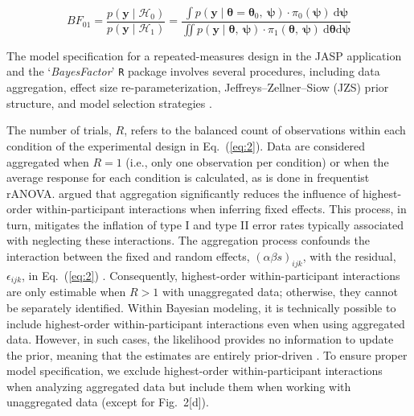\documentclass[preprint,12pt,authoryear]{elsarticle}
\begin{document}
\begin{equation} \label{eq:4}
	\mathit{BF}_{01}=\frac{p(\mathbf{y}\mid\mathcal{H}_0)}{p(\mathbf{y}\mid\mathcal{H}_1)}=\frac{\int p(\mathbf{y}\mid\boldsymbol{\theta}=\boldsymbol{\theta}_0,\ \!\boldsymbol{\psi})\cdot\pi_0(\boldsymbol{\psi})\ \!\mathrm{d}\boldsymbol{\psi}}{\iint p(\mathbf{y}\mid\boldsymbol{\theta},\ \!\boldsymbol{\psi})\cdot\pi_1(\boldsymbol{\theta},\ \!\boldsymbol{\psi})\ \!\mathrm{d}\boldsymbol{\theta}\mathrm{d}\boldsymbol{\psi}}
\end{equation}

The model specification for a repeated-measures design in the JASP application and the `\textit{BayesFactor}' \texttt{R} package involves several procedures, including data aggregation, effect size re-parameterization, Jeffreys–Zellner–Siow (JZS) prior structure, and model selection strategies \citetext{%
	\citealp{van_doorn_bayes_2023,van_doorn_bayes_2023-1,van_doorn_bayes_2023-2}; %
	see also \citealp{heathcote_limits_2023,heck_benefits_2023,jeffreys_invariant_1946,liang_mixtures_2008,linde_bayes_2023,rouder_principles_2023,singmann_statistics_2023,vasishth_sample_2023,verissimo_when_2023,zellner_posterior_1980}}.
	
The number of trials, $R$, refers to the balanced count of observations within each condition of the experimental design in Eq.~(\ref{eq:2}). Data are considered aggregated when $R=1$ (i.e., only one observation per condition) or when the average response for each condition is calculated, as is done in frequentist rANOVA. \citet[p.~4]{van_doorn_bayes_2023} argued that aggregation significantly reduces the influence of highest-order within-participant interactions when inferring fixed effects. This process, in turn, mitigates the inflation of type I and type II error rates typically associated with neglecting these interactions. The aggregation process confounds the interaction between the fixed and random effects, $(\alpha\beta s)_{ijk}$, with the residual, $\epsilon_{ijk}$, in Eq.~(\ref{eq:2}) \citetext{%
	\citealp[p.~488]{loftus_using_1994}; %
	\citealp[p.~69]{singmann_statistics_2023}; %
	\citealp[p.~7]{van_den_bergh_bayesian_2023}; %
	\citealp[p.~7]{van_doorn_bayes_2023}; %
	see also \citealp[p.~1785]{allen_bayesian_2023}; %
	\citealp[p.~12]{shang_spatially_2022}}.
Consequently, highest-order within-participant interactions are only estimable when $R>1$ with unaggregated data; otherwise, they cannot be separately identified. Within Bayesian modeling, it is technically possible to include highest-order within-participant interactions even when using aggregated data. However, in such cases, the likelihood provides no information to update the prior, meaning that the estimates are entirely prior-driven \citep[p.~5]{van_doorn_bayes_2023}. To ensure proper model specification, we exclude highest-order within-participant interactions when analyzing aggregated data but include them when working with unaggregated data (except for Fig.~2[d]).
\end{document}
